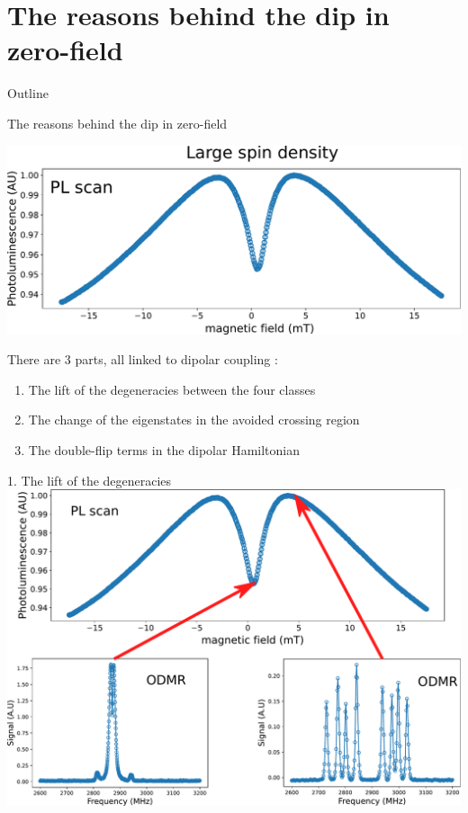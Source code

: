 \documentclass{beamer}
\begin{document}
\section{The reasons behind the dip in zero-field}
\begin{frame}{Outline}
\tableofcontents[currentsection]
\end{frame}
\begin{frame}{The reasons behind the dip in zero-field}
\begin{center}
\includegraphics[width=.8\textwidth,height=0.9\textheight,keepaspectratio]{Scan PL random dir}
\end{center}

There are 3 parts, all linked to dipolar coupling :
\begin{enumerate}
\item The lift of the degeneracies between the four classes
\item The change of the eigenstates in the avoided crossing region
\item The double-flip terms in the dipolar Hamiltonian
\end{enumerate}
\end{frame}
\begin{frame}{1. The lift of the degeneracies}
\centering
\includegraphics[width=\textwidth,height=0.9\textheight,keepaspectratio]{splitting degenerescence}
\end{frame}
\end{document}
